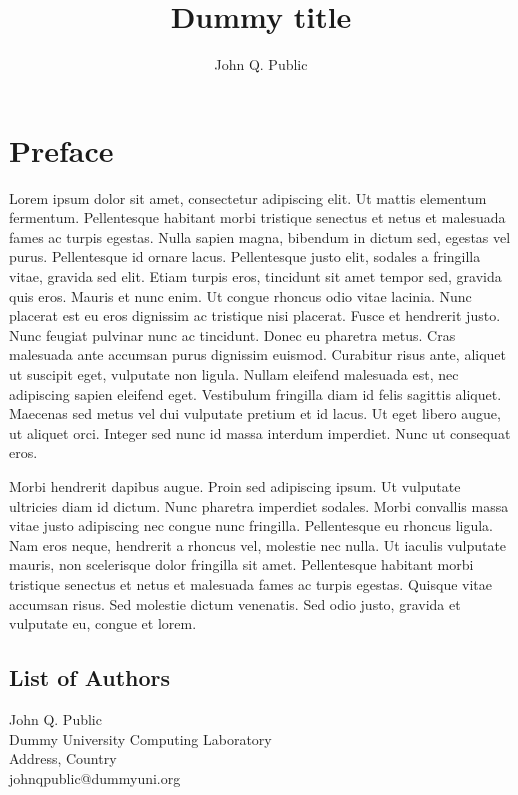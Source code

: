 \documentclass[a4paper,UKenglish]{tgdkmaster-v2021}
\begin{document}
\begin{contentslist}

\contitem
\title{Dummy title}
\author{John Q. Public}

\end{contentslist}

\chapter{Preface} %

Lorem ipsum dolor sit amet, consectetur adipiscing elit. Ut mattis
elementum fermentum. Pellentesque habitant morbi tristique senectus et
netus et malesuada fames ac turpis egestas. Nulla sapien magna,
bibendum in dictum sed, egestas vel purus. Pellentesque id ornare
lacus. Pellentesque justo elit, sodales a fringilla vitae, gravida sed
elit. Etiam turpis eros, tincidunt sit amet tempor sed, gravida quis
eros. Mauris et nunc enim. Ut congue rhoncus odio vitae lacinia. Nunc
placerat est eu eros dignissim ac tristique nisi placerat. Fusce et
hendrerit justo. Nunc feugiat pulvinar nunc ac tincidunt. Donec eu
pharetra metus. Cras malesuada ante accumsan purus dignissim
euismod. Curabitur risus ante, aliquet ut suscipit eget, vulputate non
ligula. Nullam eleifend malesuada est, nec adipiscing sapien eleifend
eget. Vestibulum fringilla diam id felis sagittis aliquet. Maecenas
sed metus vel dui vulputate pretium et id lacus. Ut eget libero augue,
ut aliquet orci. Integer sed nunc id massa interdum imperdiet. Nunc ut
consequat eros.

Morbi hendrerit dapibus augue. Proin sed adipiscing ipsum. Ut
vulputate ultricies diam id dictum. Nunc pharetra imperdiet
sodales. Morbi convallis massa vitae justo adipiscing nec congue nunc
fringilla. Pellentesque eu rhoncus ligula. Nam eros neque, hendrerit a
rhoncus vel, molestie nec nulla. Ut iaculis vulputate mauris, non
scelerisque dolor fringilla sit amet. Pellentesque habitant morbi
tristique senectus et netus et malesuada fames ac turpis
egestas. Quisque vitae accumsan risus. Sed molestie dictum
venenatis. Sed odio justo, gravida et vulputate eu, congue et lorem. 

\begin{participants}
\chapter[Authors]{List of Authors}
\participant John Q. Public\\ 
  Dummy University Computing Laboratory\\
  Address, Country\\
  johnqpublic@dummyuni.org

\end{participants} 
\end{document}

